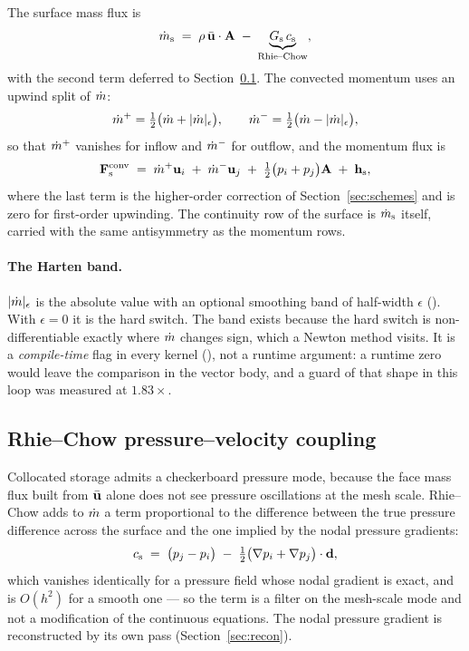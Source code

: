 The surface mass flux is
\begin{equation}
\dot{m}_{\mathrm{s}} \;=\; \rho\,\bar{\mathbf{u}}\cdot\mathbf{A} \;-\; \underbrace{G_{\mathrm{s}}\,c_{\mathrm{s}}}_{\text{Rhie--Chow}},
\label{eq:mdot}
\end{equation}
with the second term deferred to Section~\ref{sec:rc}. The convected momentum uses an upwind
split of $\dot{m}$:
\begin{equation}
\dot{m}^{+} = \tfrac12\bigl(\dot{m} + |\dot{m}|_\epsilon\bigr), \qquad
\dot{m}^{-} = \tfrac12\bigl(\dot{m} - |\dot{m}|_\epsilon\bigr),
\end{equation}
so that $\dot{m}^{+}$ vanishes for inflow and $\dot{m}^{-}$ for outflow, and the momentum flux is
\begin{equation}
\mathbf{F}^{\text{conv}}_{\mathrm{s}} \;=\; \dot{m}^{+}\mathbf{u}_i \;+\; \dot{m}^{-}\mathbf{u}_j
      \;+\; \tfrac12\bigl(p_i + p_j\bigr)\mathbf{A} \;+\; \mathbf{h}_{\mathrm{s}} ,
\label{eq:flux}
\end{equation}
where the last term is the higher-order correction of Section~\ref{sec:schemes} and is zero for
first-order upwinding. The continuity row of the surface is $\dot{m}_{\mathrm{s}}$ itself, carried with the
same antisymmetry as the momentum rows.

\paragraph{The Harten band.} $|\dot{m}|_\epsilon$ is the absolute value with an optional smoothing
band of half-width $\epsilon$ (). With $\epsilon = 0$ it is the hard
switch. The band exists because the hard switch is non-differentiable exactly where $\dot{m}$
changes sign, which a Newton method visits. It is a \emph{compile-time} flag in every kernel
(), not a runtime argument: a runtime zero would leave the comparison in the vector body,
and a guard of that shape in this loop was measured at $1.83\times$.

\subsection{Rhie--Chow pressure--velocity coupling}
\label{sec:rc}

Collocated storage admits a checkerboard pressure mode, because the face mass flux built from
$\bar{\mathbf{u}}$ alone does not see pressure oscillations at the mesh scale. Rhie--Chow adds to
$\dot{m}$ a term proportional to the difference between the true pressure difference across the
surface and the one implied by the nodal pressure gradients:
\begin{equation}
c_{\mathrm{s}} \;=\; \bigl(p_j - p_i\bigr) \;-\; \tfrac12\bigl(\nabla p_i + \nabla p_j\bigr)\cdot\mathbf{d} ,
\label{eq:corr}
\end{equation}
which vanishes identically for a pressure field whose nodal gradient is exact, and is $O(h^2)$
for a smooth one --- so the term is a filter on the mesh-scale mode and not a modification of the
continuous equations. The nodal pressure gradient is reconstructed by its own pass
(Section~\ref{sec:recon}).

